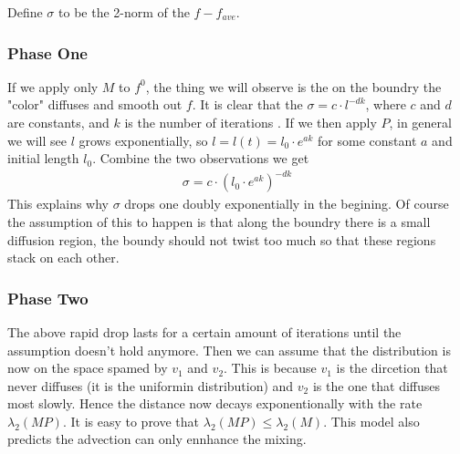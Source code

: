 Define $\sigma$ to be the 2-norm of the $f- f_{ave}$.    

\subsubsection{Phase One}
If we apply only $M$ to $f^0$, the thing we will observe is the on the boundry the "color" diffuses and smooth out $f$. It is clear that the $\sigma = c \cdot l^{-dk}$, where $c$ and $d$ are constants, and $k$ is the number of iterations . If we then apply $P$, in general we will see $l$ grows exponentially, so $l=l(t)= l_{0} \cdot e^{ak}$ for some constant $a$ and initial length $l_{0}$. Combine the two observations we get 
\begin{eqnarray*}
  \sigma = c \cdot (l_{0} \cdot e^{ak})^{-dk}
\end{eqnarray*}  
This explains why $\sigma$ drops one doubly exponentially in the begining. Of course the assumption of this to happen is that along the boundry there is a small diffusion region, the boundy should not twist too much so that these regions stack on each other.    

\subsubsection{Phase Two}
The above rapid drop lasts for a certain amount of iterations until the assumption doesn't hold anymore. Then we can assume that the distribution is now on the space spamed by $v_1$ and $v_2$. This is because $v_1$ is the dircetion that never diffuses (it is the uniformin distribution) and $v_2$ is the one that diffuses most slowly. Hence the distance now decays exponentionally with the rate $\lambda_2(MP)$. It is easy to prove that $\lambda_2(MP) \le \lambda_2(M)$. This model also predicts the advection can only ennhance the mixing. 

